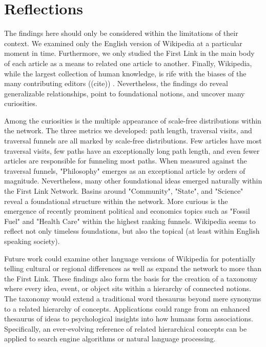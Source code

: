 \documentclass[pre,twocolumn,twoside,superscriptaddress,floatfix, aps, 10pt]{revtex4-1}
\begin{document}

\section{Reflections}

The findings here should only be considered within the limitations of their context.
We examined only the English version of Wikipedia at a particular moment in time.
Furthermore, we only studied the First Link in the main body  of each article
as a means to related one article to another. Finally, Wikipedia, while the largest 
collection of human knowledge, is rife with the biases of the many contributing editors ((cite))
. Nevertheless, the findings do reveal
generalizable relationships, point to foundational notions, and uncover many curiosities.


Among the curiosities is the multiple appearance of scale-free distributions within the network. 
The three metrics we developed: path length, traversal visits, and traversal funnels are all marked 
by scale-free distributions. Few articles have most traversal visits, few paths have an exceptionally long path length, and even fewer
articles are responsible for funneling most paths. When measured against the traversal funnels, 
"Philosophy" emerges as an exceptional article by orders of magnitude. 
Nevertheless, many other foundational ideas emerged naturally within the First Link Network. 
Basins around "Community", "State", and "Science" reveal a foundational structure within the network. 
More curious is the emergence of recently prominent political and economics topics such as "Fossil Fuel" and "Health Care" 
within the highest ranking funnels. 
Wikipedia seems to reflect not only timeless foundations, but also the topical (at least within English speaking society).

Future work could examine other language versions of Wikipedia for potentially telling cultural or regional differences as well as expand the network to more than the First Link.
These findings also form the basis for the creation of a taxonomy where 
every idea, event, or object sits within a hierarchy of connected notions.
The taxonomy would extend a traditional word thesaurus beyond mere synonyms to a related hierarchy of concepts.
Applications could range from an enhanced thesaurus of ideas to psychological insights into how humans form associations.
Specifically, an ever-evolving reference of related hierarchical concepts can be applied to search engine algorithms 
or natural language processing.
\end{document}

